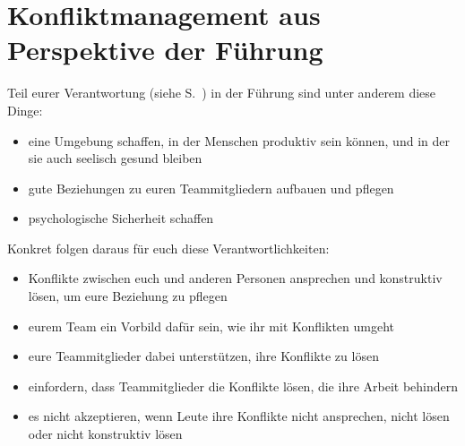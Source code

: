 \section{Konfliktmanagement aus Perspektive der Führung}
\label{konflikte-fuehrung}

Teil eurer Verantwortung (siehe S.~\pageref{fuehrung-aufgaben-neuberger}) in der Führung sind unter anderem diese Dinge:

\begin{itemize}
  \item eine Umgebung schaffen, in der Menschen produktiv sein können, und in der sie auch seelisch gesund bleiben
  \item gute Beziehungen zu euren Teammitgliedern aufbauen und pflegen
  \item psychologische Sicherheit schaffen
\end{itemize}

Konkret folgen daraus für euch diese Verantwortlichkeiten:

\begin{itemize}
  \item Konflikte zwischen euch und anderen Personen ansprechen und konstruktiv lösen, um eure Beziehung zu pflegen
  \item eurem Team ein Vorbild dafür sein, wie ihr mit Konflikten umgeht
  \item eure Teammitglieder dabei unterstützen, ihre Konflikte zu lösen
  \item einfordern, dass Teammitglieder die Konflikte lösen, die ihre Arbeit behindern
  \item es nicht akzeptieren, wenn Leute ihre Konflikte nicht ansprechen, nicht lösen oder nicht konstruktiv lösen
\end{itemize}
